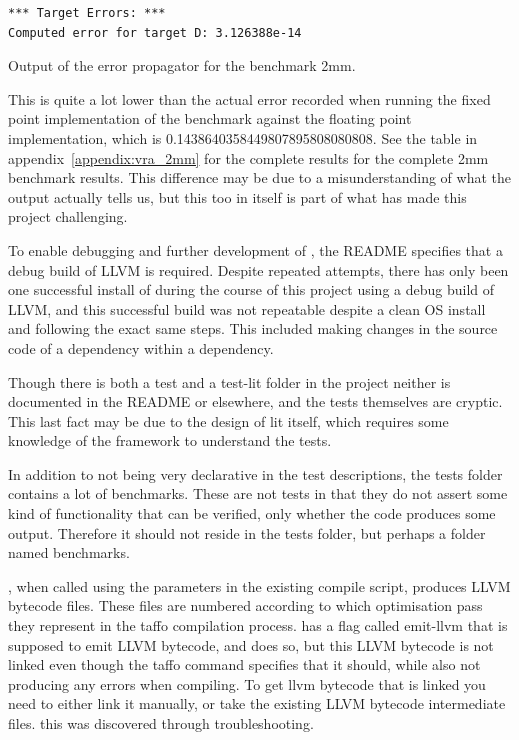 \begin{lstlisting}
*** Target Errors: ***
Computed error for target D: 3.126388e-14
\end{lstlisting}
\caption{Output of the \taffo{} error propagator for the benchmark 2mm.}
\label{listing:error_prop_2mm}

This is quite a lot lower than the actual error recorded when running the fixed point implementation of the benchmark against the floating point implementation, which is 0.1438640358449807895808080808. See the table in appendix~\ref{appendix:vra_2mm} for the complete results for the complete 2mm benchmark results. This difference may be due to a misunderstanding of what the output actually tells us, but this too in itself is part of what has made this project challenging.

To enable debugging and further development of \taffo{}, the README specifies that a debug build of LLVM is required. Despite repeated attempts, there has only been one successful install of \taffo{} during the course of this project using a debug build of LLVM, and this successful build was not repeatable despite a clean OS install and following the exact same steps. This included making changes in the source code of a dependency within a \taffo{} dependency.  

Though there is both a test and a test-lit folder in the \taffo{} project neither is documented in the README or elsewhere, and the tests themselves are cryptic. This last fact may be due to the design of lit itself, which requires some knowledge of the framework to understand the tests. 

In addition to not being very declarative in the test descriptions, the tests folder contains a lot of benchmarks. These are not tests in that they do not assert some kind of functionality that can be verified, only whether the code produces \*some\* output. Therefore it should not reside in the tests folder, but perhaps a folder named benchmarks.

\taffo{}, when called using the parameters in the existing compile script, produces LLVM bytecode files. These files are numbered according to which optimisation pass they represent in the taffo compilation process. \taffo{} has a flag called emit-llvm that is supposed to emit LLVM bytecode, and does so, but this LLVM bytecode is not linked even though the taffo command specifies that it should, while also not producing any errors when compiling. To get llvm bytecode that is linked you need to either link it manually, or take the existing LLVM bytecode intermediate files. this was discovered through troubleshooting. 



